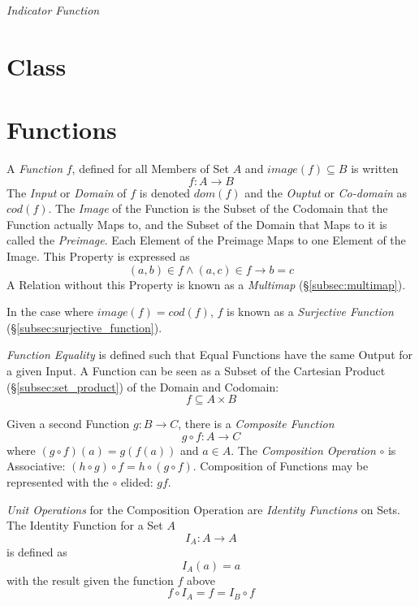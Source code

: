 \documentclass{article}
\begin{document}
\emph{Indicator Function}

\section{Class}\label{sec:class}

\section{Functions}\label{sec:set_functions}

A \emph{Function} $f$, defined for all Members of Set $A$ and $image(f)
\subseteq B$ is written
\[
    f : A \rightarrow B
\]
The \emph{Input} or \emph{Domain} of $f$ is denoted $dom(f)$ and the
\emph{Ouptut} or \emph{Co-domain} as $cod(f)$. The \emph{Image} of the
Function is the Subset of the Codomain that the Function actually Maps
to, and the Subset of the Domain that Maps to it is called the
\emph{Preimage}. Each Element of the Preimage Maps to one Element of
the Image. This Property is expressed as
\[
    (a,b) \in f \wedge (a,c) \in f \rightarrow b = c
\]
A Relation without this Property is known as a \emph{Multimap}
(\S\ref{subsec:multimap}).

In the case where $image(f) = cod(f)$, $f$ is known as a
\emph{Surjective Function} (\S\ref{subsec:surjective_function}).

\emph{Function Equality} is defined such that Equal Functions have the
same Output for a given Input. A Function can be seen as a Subset of
the Cartesian Product (\S\ref{subsec:set_product}) of the Domain and
Codomain:
\[
    f \subseteq A \times B
\]

Given a second Function $g : B \rightarrow C$, there is a
\emph{Composite Function}
\[
    g \circ f : A \rightarrow C
\]
where $(g \circ f)(a) = g(f(a))$ and $a \in A$. The \emph{Composition
  Operation} $\circ$ is Associative: $(h \circ g) \circ f = h \circ (g
\circ f)$. Composition of Functions may be represented with the
$\circ$ elided: $gf$.

\emph{Unit Operations} for the Composition Operation are
\emph{Identity Functions} on Sets. The Identity Function for a Set $A$
\[
    I_A : A \rightarrow A
\]
is defined as
\[
    I_A(a) = a
\]
with the result given the function $f$ above
\[
    f \circ I_A = f = I_B \circ f
\]
\end{document}
